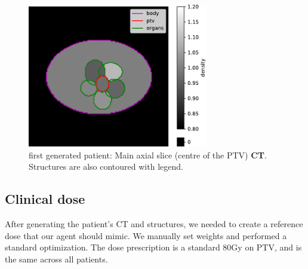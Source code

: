 \begin{figure}
	\centering
	\includegraphics[width=0.7\textwidth]{main_slice-ct.pdf}
	\caption{first generated patient: Main axial slice (centre of the PTV) \textbf{CT}.\\ Structures are also contoured with legend.}
	\label{fig:main_slice-ct}
\end{figure}

\subsection*{Clinical dose}
After generating the patient's CT and structures, we needed to create a reference dose that our agent should mimic.
We manually set weights and performed a standard optimization.
The dose prescription is a standard 80Gy on PTV, and is the same across all patients.

